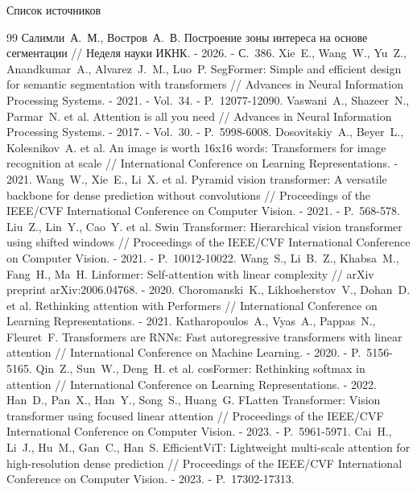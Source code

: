 \documentclass[aspectratio=169,xcolor=table]{beamer}
\begin{document}
\begin{frame}[allowframebreaks]{Список источников}
  \tiny
  \begin{thebibliography}{99}
     Салимли~А.~М., Востров~А.~В. Построение зоны интереса на основе сегментации // Неделя науки ИКНК. - 2026. - С.~386.
     Xie~E., Wang~W., Yu~Z., Anandkumar~A., Alvarez~J.~M., Luo~P. SegFormer: Simple and efficient design for semantic segmentation with transformers // Advances in Neural Information Processing Systems. - 2021. - Vol.~34. - P.~12077-12090.
     Vaswani~A., Shazeer~N., Parmar~N. et al. Attention is all you need // Advances in Neural Information Processing Systems. - 2017. - Vol.~30. - P.~5998-6008.
     Dosovitskiy~A., Beyer~L., Kolesnikov~A. et al. An image is worth 16x16 words: Transformers for image recognition at scale // International Conference on Learning Representations. - 2021.
     Wang~W., Xie~E., Li~X. et al. Pyramid vision transformer: A versatile backbone for dense prediction without convolutions // Proceedings of the IEEE/CVF International Conference on Computer Vision. - 2021. - P.~568-578.
     Liu~Z., Lin~Y., Cao~Y. et al. Swin Transformer: Hierarchical vision transformer using shifted windows // Proceedings of the IEEE/CVF International Conference on Computer Vision. - 2021. - P.~10012-10022.
     Wang~S., Li~B.~Z., Khabsa~M., Fang~H., Ma~H. Linformer: Self-attention with linear complexity // arXiv preprint arXiv:2006.04768. - 2020.
     Choromanski~K., Likhosherstov~V., Dohan~D. et al. Rethinking attention with Performers // International Conference on Learning Representations. - 2021.
     Katharopoulos~A., Vyas~A., Pappas~N., Fleuret~F. Transformers are RNNs: Fast autoregressive transformers with linear attention // International Conference on Machine Learning. - 2020. - P.~5156-5165.
     Qin~Z., Sun~W., Deng~H. et al. cosFormer: Rethinking softmax in attention // International Conference on Learning Representations. - 2022.
     Han~D., Pan~X., Han~Y., Song~S., Huang~G. FLatten Transformer: Vision transformer using focused linear attention // Proceedings of the IEEE/CVF International Conference on Computer Vision. - 2023. - P.~5961-5971.
     Cai~H., Li~J., Hu~M., Gan~C., Han~S. EfficientViT: Lightweight multi-scale attention for high-resolution dense prediction // Proceedings of the IEEE/CVF International Conference on Computer Vision. - 2023. - P.~17302-17313.

\end{thebibliography}
\end{frame}
\end{document}
